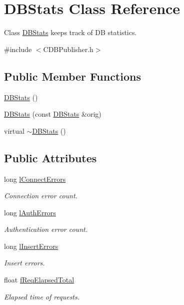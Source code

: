 \hypertarget{class_d_b_stats}{\section{\-D\-B\-Stats \-Class \-Reference}
\label{class_d_b_stats}
}


\-Class \hyperlink{class_d_b_stats}{\-D\-B\-Stats} keeps track of \-D\-B statistics.  




{\ttfamily \#include $<$\-C\-D\-B\-Publisher.\-h$>$}

\subsection*{\-Public \-Member \-Functions}
\begin{DoxyCompactItemize}
\item 
\hyperlink{class_d_b_stats_a09473aa7835d3ffe23c11970a14a69da}{\-D\-B\-Stats} ()
\item 
\hyperlink{class_d_b_stats_ab2b7f932a265dde2a10960fb0aac868e}{\-D\-B\-Stats} (const \hyperlink{class_d_b_stats}{\-D\-B\-Stats} \&orig)
\item 
virtual \hyperlink{class_d_b_stats_a9cada2da1fca47be6144364287a8cbe5}{$\sim$\-D\-B\-Stats} ()
\end{DoxyCompactItemize}
\subsection*{\-Public \-Attributes}
\begin{DoxyCompactItemize}
\item 
long \hyperlink{class_d_b_stats_a5a5e64788999fb00f9530275e62c6bdb}{l\-Connect\-Errors}
\begin{DoxyCompactList}\small\item\em \-Connection error count. \end{DoxyCompactList}\item 
long \hyperlink{class_d_b_stats_ae41b0a6c9128d35c08721cce020158f4}{l\-Auth\-Errors}
\begin{DoxyCompactList}\small\item\em \-Authentication error count. \end{DoxyCompactList}\item 
long \hyperlink{class_d_b_stats_a07bd5ba687fa2c6a5049e0524310364d}{l\-Insert\-Errors}
\begin{DoxyCompactList}\small\item\em \-Insert errors. \end{DoxyCompactList}\item 
float \hyperlink{class_d_b_stats_a7715ab06ef60c47ffb5fa708a17e3d8e}{f\-Req\-Elapsed\-Total}
\begin{DoxyCompactList}\small\item\em \-Elapsed time of requests. \end{DoxyCompactList}\end{DoxyCompactItemize}


